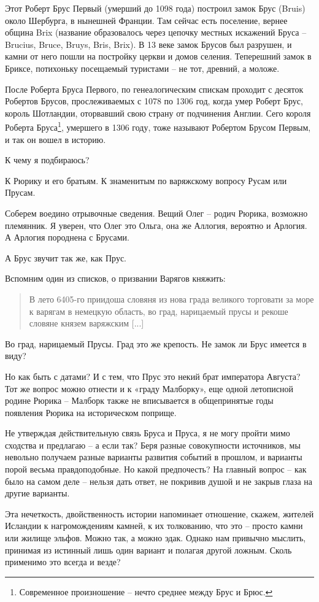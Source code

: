 Этот Роберт Брус Первый (умерший до 1098 года) построил замок Брус (Bruis) около Шербурга, в нынешней Франции. Там сейчас есть поселение, вернее община Brix (название образовалось через цепочку местных искажений Бруса –  Brucius, Bruce, Bruys, Bris, Brix). В 13 веке замок Брусов был разрушен, и камни от него пошли на постройку церкви и домов селения. Теперешний замок в Бриксе, потихоньку посещаемый туристами – не тот, древний, а моложе.

После Роберта Бруса Первого, по генеалогическим спискам проходит с десяток Робертов Брусов, прослеживаемых с 1078 по 1306 год, когда умер Роберт Брус, король Шотландии, оторвавший свою страну от подчинения Англии. Сего короля Роберта Бруса\footnote{Современное произношение – нечто среднее между Брус и Брюс.}, умершего в 1306 году, тоже называют Робертом Брусом Первым, и так он вошел в историю. 

К чему я подбираюсь?

К Рюрику и его братьям. К знаменитым по варяжскому вопросу Русам или Прусам.

Соберем воедино отрывочные сведения. Вещий Олег – родич Рюрика, возможно племянник. Я уверен, что Олег это Ольга, она же Аллогия, вероятно и Арлогия. А Арлогия породнена с Брусами.

А Брус звучит так же, как Прус.

Вспомним один из списков, о призвании Варягов княжить:

\begin{quotation}
В лето 6405-го приидоша словяня из нова града великого  торговати за море к варягам в немецкую область, во град, нарицаемый прусы и рекоше словяне князем варяжским [...]
\end{quotation}

Во град, нарицаемый Прусы. Град это же крепость. Не замок ли Брус имеется в виду?

Но как быть с датами? И с тем, что Прус это некий брат императора Августа? Тот же вопрос можно отнести и к «граду Малборку», еще одной летописной родине Рюрика – Малборк также не вписывается в общепринятые годы появления Рюрика на историческом поприще.

Не утверждая действительную связь Бруса и Пруса, я не могу пройти мимо сходства и предлагаю – а если так? Беря разные совокупности источников, мы невольно получаем разные варианты развития событий в прошлом, и варианты порой весьма правдоподобные. Но какой предпочесть? На главный вопрос – как было на самом деле – нельзя дать ответ, не покривив душой и не закрыв глаза на другие варианты. 

Эта нечеткость, двойственность истории напоминает отношение, скажем, жителей Исландии к нагромождениям камней, к их толкованию, что это – просто камни или жилище эльфов. Можно так, а можно эдак. Однако нам привычно мыслить, принимая из истинный лишь один вариант и полагая другой ложным. Сколь применимо это всегда и везде?

